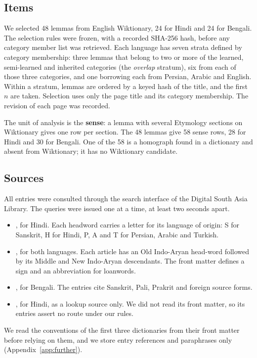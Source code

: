 \documentclass[11pt]{article}
\begin{document}
\subsection{Items}

We selected 48 lemmas from English Wiktionary, 24 for Hindi and 24 for Bengali. The selection rules were frozen, with a recorded SHA-256 hash, before any category member list was retrieved. Each language has seven strata defined by category membership: three lemmas that belong to two or more of the learned, semi-learned and inherited categories (the \textit{overlap} stratum), six from each of those three categories, and one borrowing each from Persian, Arabic and English. Within a stratum, lemmas are ordered by a keyed hash of the title, and the first $n$ are taken. Selection uses only the page title and its category membership. The revision of each page was recorded.

The unit of analysis is the \textbf{sense}: a lemma with several Etymology sections on Wiktionary gives one row per section. The 48 lemmas give 58 sense rows, 28 for Hindi and 30 for Bengali. One of the 58 is a homograph found in a dictionary and absent from Wiktionary; it has no Wiktionary candidate.

\subsection{Sources}

All entries were consulted through the search interface of the Digital South Asia Library. The queries were issued one at a time, at least two seconds apart.
\begin{itemize}
\item \textbf{\citet{platts1884}}, for Hindi. Each headword carries a letter for its language of origin: S for Sanskrit, H for Hindi, P, A and T for Persian, Arabic and Turkish.
\item \textbf{\citet{turner1966cdial}}, for both languages. Each article has an Old Indo-Aryan head-word followed by its Middle and New Indo-Aryan descendants. The front matter defines a sign and an abbreviation for loanwords.
\item \textbf{\citet{dasa1937bangala}}, for Bengali. The entries cite Sanskrit, Pali, Prakrit and foreign source forms.
\item \textbf{\citet{dasa1975sabdasagara}}, for Hindi, as a lookup source only. We did not read its front matter, so its entries assert no route under our rules.
\end{itemize}
We read the conventions of the first three dictionaries from their front matter before relying on them, and we store entry references and paraphrases only (Appendix~\ref{app:further}).
\end{document}
